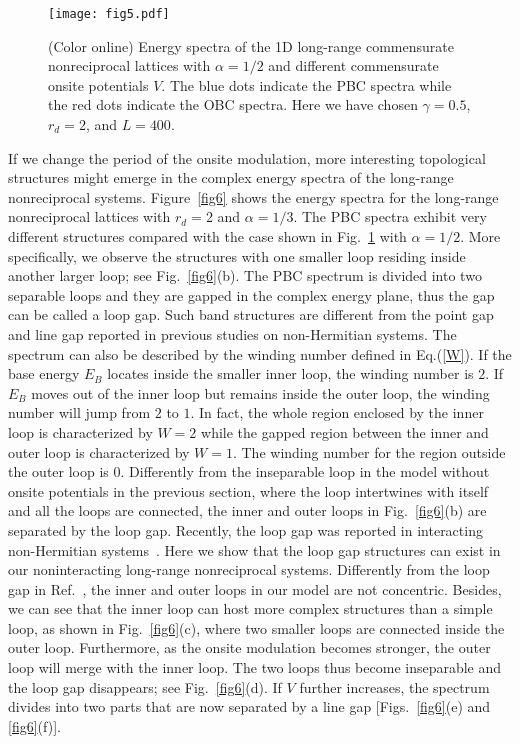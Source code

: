 \documentclass[prb,aps,twocolumn,showpacs]{revtex4-2} %
\begin{document}
\begin{figure}[t]
  \texttt{[image: fig5.pdf]}
  \caption{(Color online) Energy spectra of the 1D long-range commensurate nonreciprocal lattices with $\alpha=1/2$ and different commensurate onsite potentials $V$. The blue dots indicate the PBC spectra while the red dots indicate the OBC spectra. Here we have chosen $\gamma=0.5$, $r_d=2$, and $L=400$.}
\label{fig5}
\end{figure}

If we change the period of the onsite modulation, more interesting topological structures might emerge in the complex energy spectra of the long-range nonreciprocal systems. Figure~\ref{fig6} shows the energy spectra for the long-range nonreciprocal lattices with $r_d=2$ and $\alpha=1/3$. The PBC spectra exhibit very different structures compared with the case shown in Fig.~\ref{fig5} with $\alpha=1/2$. More specifically, we observe the structures with one smaller loop residing inside another larger loop; see Fig.~\ref{fig6}(b). The PBC spectrum is divided into two separable loops and they are gapped in the complex energy plane, thus the gap can be called a loop gap. Such band structures are different from the point gap and line gap reported in previous studies on non-Hermitian systems. The spectrum can also be described by the winding number defined in Eq.(\ref{W}). If the base energy $E_B$ locates inside the smaller inner loop, the winding number is $2$. If $E_B$ moves out of the inner loop but remains inside the outer loop, the winding number will jump from $2$ to $1$. In fact, the whole region enclosed by the inner loop is characterized by $W=2$ while the gapped region between the inner and outer loop is characterized by $W=1$. The winding number for the region outside the outer loop is $0$. Differently from the inseparable loop in the model without onsite potentials in the previous section, where the loop intertwines with itself and all the loops are connected, the inner and outer loops in Fig.~\ref{fig6}(b) are separated by the loop gap. Recently, the loop gap was reported in interacting non-Hermitian systems~\cite{Shen2021arxiv}. Here we show that the loop gap structures can exist in our noninteracting long-range nonreciprocal systems. Differently from the loop gap in Ref.~\cite{Shen2021arxiv}, the inner and outer loops in our model are not concentric. Besides, we can see that the inner loop can host more complex structures than a simple loop, as shown in Fig.~\ref{fig6}(c), where two smaller loops  are connected inside the outer loop. Furthermore, as the onsite modulation becomes stronger, the outer loop will merge with the inner loop. The two loops thus become inseparable and the loop gap disappears; see Fig.~\ref{fig6}(d). If $V$ further increases, the spectrum divides into two parts that are now separated by a line gap [Figs.~\ref{fig6}(e) and \ref{fig6}(f)].
\end{document}
